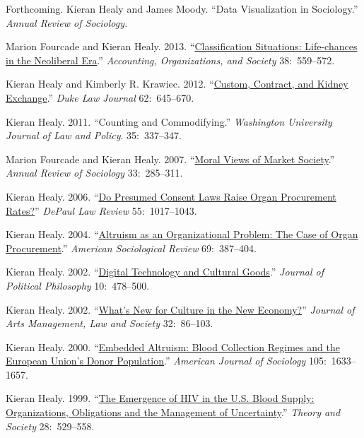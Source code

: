 \documentclass[11pt,article,oneside]{memoir}
\begin{document}
\ind Forthcoming. Kieran Healy and James Moody. ``Data Visualization in Sociology.'' \emph{Annual Review of Sociology.}

\ind Marion Fourcade and Kieran Healy. 2013. ``\href{http://kieranhealy.org/files/papers/classification-situations.pdf}{Classification Situations: Life-chances in the Neoliberal Era}.'' \emph{Accounting, Organizations, and Society} 38:~559--572.

\ind Kieran Healy and Kimberly R. Krawiec. 2012. ``\href{http://kieranhealy.org/files/papers/custom-contract-kidney.pdf}{Custom, Contract, and Kidney Exchange}.'' \emph{Duke Law Journal} 62:~645--670. 

\ind Kieran Healy. 2011. ``Counting and Commodifying.'' \emph{Washington University Journal of Law and Policy}. 35:~337--347.

\ind Marion Fourcade and Kieran Healy. 2007. ``\href{http://arjournals.annualreviews.org/doi/pdf/10.1146/annurev.soc.33.040406.131642}{Moral Views of Market Society}.'' \emph{Annual Review of Sociology} 33:~285--311. 

\ind Kieran Healy. 2006. ``\href{http://www.kieranhealy.org/files/papers/presumed-consent.pdf}{Do Presumed Consent Laws Raise Organ Procurement Rates?}'' \emph{DePaul Law Review} 55:~1017--1043. 

\ind Kieran Healy. 2004. ``\href{http://www.kieranhealy.org/files/papers/asr2004.pdf}{Altruism as an Organizational Problem: The Case of Organ Procurement}.''
 \emph{American Sociological Review} 69:~387--404.

\ind Kieran Healy. 2002. ``\href{http://www.kieranhealy.org/files/papers/jpp.pdf}{Digital Technology and Cultural Goods}.'' \emph{Journal of
  Political Philosophy} 10:~478--500. 

\ind Kieran Healy. 2002. ``\href{http://www.kieranhealy.org/files/papers/culture-newecon.pdf}{What's New for Culture in the New Economy?}'' \emph{Journal
  of Arts Management, Law and Society} 32:~86--103. 


\ind Kieran Healy. 2000. ``\href{http://www.kieranhealy.org/files/papers/embed-alt.pdf}{Embedded Altruism: Blood Collection Regimes and the European
  Union's Donor Population}.'' \emph{American Journal of Sociology} 105:~1633--1657.


\ind Kieran Healy. 1999.  ``\href{http://www.kieranhealy.org/files/papers/ts.pdf}{The Emergence of HIV in the U.S. Blood Supply: Organizations,
  Obligations and the Management of Uncertainty}.'' \emph{Theory and Society} 28:~529--558.
\end{document}
